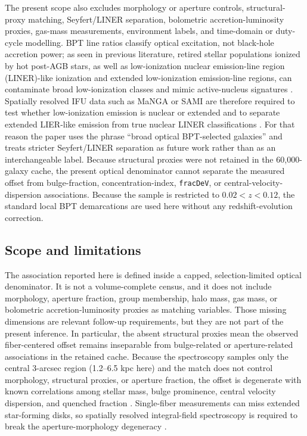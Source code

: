 \documentclass[twocolumn]{aastex631}
\begin{document}
The present scope also excludes morphology or aperture controls, structural-proxy matching, Seyfert/LINER separation, bolometric accretion-luminosity proxies, gas-mass measurements, environment labels, and time-domain or duty-cycle modelling. BPT line ratios classify optical excitation, not black-hole accretion power; as seen in previous literature, retired stellar populations ionized by hot post-AGB stars, as well as low-ionization nuclear emission-line region (LINER)-like ionization and extended low-ionization emission-line regions, can contaminate broad low-ionization classes and mimic active-nucleus signatures \citep{cidfernandes2011,stasinska2008,stasinska2015,belfiore2016}. Spatially resolved IFU data such as MaNGA or SAMI are therefore required to test whether low-ionization emission is nuclear or extended and to separate extended LIER-like emission from true nuclear LINER classifications \citep{belfiore2016}. For that reason the paper uses the phrase ``broad optical BPT-selected galaxies'' and treats stricter Seyfert/LINER separation as future work rather than as an interchangeable label. Because structural proxies were not retained in the 60,000-galaxy cache, the present optical denominator cannot separate the measured offset from bulge-fraction, concentration-index, \texttt{fracDeV}, or central-velocity-dispersion associations. Because the sample is restricted to $0.02<z<0.12$, the standard local BPT demarcations are used here without any redshift-evolution correction.

\subsection{Scope and limitations}
The association reported here is defined inside a capped, selection-limited optical denominator. It is not a volume-complete census, and it does not include morphology, aperture fraction, group membership, halo mass, gas mass, or bolometric accretion-luminosity proxies as matching variables. Those missing dimensions are relevant follow-up requirements, but they are not part of the present inference. In particular, the absent structural proxies mean the observed fiber-centered offset remains inseparable from bulge-related or aperture-related associations in the retained cache. Because the spectroscopy samples only the central 3-arcsec region (1.2--6.5 kpc here) and the match does not control morphology, structural proxies, or aperture fraction, the offset is degenerate with known correlations among stellar mass, bulge prominence, central velocity dispersion, and quenched fraction \citep{schawinski2010,bluck2014,piotrowska2022}. Single-fiber measurements can miss extended star-forming disks, so spatially resolved integral-field spectroscopy is required to break the aperture-morphology degeneracy \citep{penny2018,cheung2016,bundy2015,canodiaz2016}.
\end{document}
